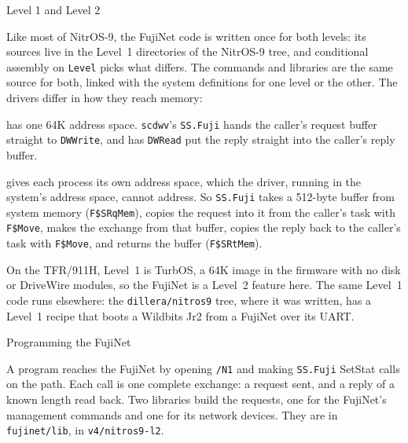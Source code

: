 \documentclass[10pt,twoside,openany]{book}
\makeatletter
\newcommand{\file}[1]{\texttt{#1}}           %
\newcommand{\sans}[1]{\textsf{#1}}
\renewcommand{\section}{\@startsection{section}{1}{0pt}{3.2ex plus 1ex}{1.2ex}%
  {\sffamily\bfseries\large}}
\renewcommand{\subsection}{\@startsection{subsection}{2}{0pt}{2.4ex plus 0.6ex}{0.8ex}%
  {\sffamily\bfseries\normalsize}}
\makeatother
\begin{document}
\subsection{Level 1 and Level 2}

Like most of NitrOS-9, the FujiNet code is written once for both levels:
its sources live in the Level~1 directories of the NitrOS-9 tree, and
conditional assembly on \texttt{Level} picks what differs. The commands
and libraries are the same source for both, linked with the system
definitions for one level or the other. The drivers differ in how they
reach memory:

\begin{description}\setlength{\itemsep}{0.5ex}
\item[\sans{Level 1}] has one 64K address space. \file{scdwv}'s
\texttt{SS.Fuji} hands the caller's request buffer straight to
\texttt{DWWrite}, and has \texttt{DWRead} put the reply straight into the
caller's reply buffer.

\item[\sans{Level 2}] gives each process its own address space, which the
driver, running in the system's address space, cannot address. So
\texttt{SS.Fuji} takes a 512-byte buffer from system memory
(\texttt{F\$SRqMem}), copies the request into it from the caller's task
with \texttt{F\$Move}, makes the exchange from that buffer, copies the
reply back to the caller's task with \texttt{F\$Move}, and returns the
buffer (\texttt{F\$SRtMem}).
\end{description}

On the TFR/911H, Level~1 is TurbOS, a 64K image in the firmware with no
disk or DriveWire modules, so the FujiNet is a Level~2 feature here. The
same Level~1 code runs elsewhere: the \file{dillera/nitros9} tree, where
it was written, has a Level~1 recipe that boots a Wildbits Jr2 from a
FujiNet over its UART.

\section{Programming the FujiNet}

A program reaches the FujiNet by opening \file{/N1} and making
\texttt{SS.Fuji} SetStat calls on the path. Each call is one complete
exchange: a request sent, and a reply of a known length read back. Two
libraries build the requests, one for the FujiNet's management commands
and one for its network devices. They are in \file{fujinet/lib}, in
\file{v4/nitros9-l2}.
\end{document}
